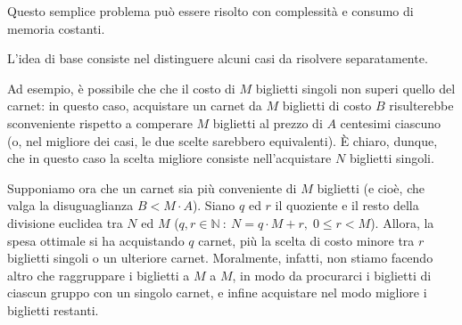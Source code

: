 

    Questo semplice problema può essere risolto con complessità e consumo di memoria costanti.
    
    \Soluzione

    L'idea di base consiste nel distinguere alcuni casi da risolvere separatamente.
    
    Ad esempio, è possibile che che il costo di $M$ biglietti singoli non superi quello del carnet: in questo caso, acquistare un carnet da $M$ biglietti di costo $B$ risulterebbe sconveniente rispetto a comperare $M$ biglietti al prezzo di $A$ centesimi ciascuno (o, nel migliore dei casi, le due scelte sarebbero equivalenti). È chiaro, dunque, che in questo caso la scelta migliore consiste nell'acquistare $N$ biglietti singoli.
    
    Supponiamo ora che un carnet sia più conveniente di $M$ biglietti (e cioè, che valga la disuguaglianza $B < M \cdot A$). Siano $q$ ed $r$ il quoziente e il resto della divisione euclidea tra $N$ ed $M$ ($q,r \in \mathbb{N} \: : \: N = q \cdot M + r, \; 0 \le r < M$). Allora, la spesa ottimale si ha acquistando $q$ carnet, più la scelta di costo minore tra $r$ biglietti singoli o un ulteriore carnet. Moralmente, infatti, non stiamo facendo altro che raggruppare i biglietti a $M$ a $M$, in modo da procurarci i biglietti di ciascun gruppo con un singolo carnet, e infine acquistare nel modo migliore i biglietti restanti.
    
    \Codice
    
    \colorbox{white}{}